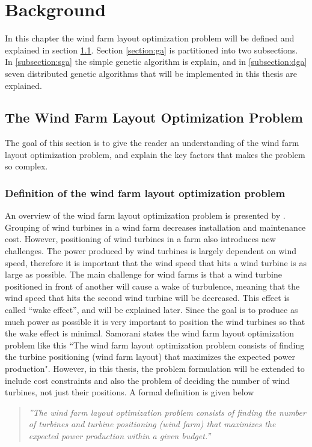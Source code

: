 \chapter{Background}
In this chapter the wind farm layout optimization problem will be defined and explained in section \ref{section:wflop}. Section \ref{section:ga} is partitioned into two subsections. In \ref{subsection:sga} the simple genetic algorithm is explain, and in \ref{subsection:dga} seven distributed genetic algorithms that will be implemented in this thesis are explained. 


\section{The Wind Farm Layout Optimization Problem}\label{section:wflop}
The goal of this section is to give the reader an understanding of the wind farm layout optimization problem, and explain the key factors that makes the problem so complex.


\subsection{Definition of the wind farm layout optimization problem}
An overview of the wind farm layout optimization problem is presented by \cite{Samorani}. Grouping of wind turbines in a wind farm decreases installation and maintenance cost. However, positioning of wind turbines in a farm also introduces new challenges. The power produced by wind turbines is largely dependent on wind speed, therefore it is important that the wind speed that hits a wind turbine is as large as possible. The main challenge for wind farms is that a wind turbine positioned in front of another will cause a wake of turbulence, meaning that the wind speed that hits the second wind turbine will be decreased. This effect is called ``wake effect'', and will be explained later. Since the goal is to produce as much power as possible it is very important to position the wind turbines so that the wake effect is minimal. Samorani states the wind farm layout optimization problem like this ``The wind farm layout optimization problem consists of finding the turbine positioning (wind farm layout) that maximizes the expected power production". However, in this thesis, the problem formulation will be extended to include cost constraints and also the problem of deciding the number of wind turbines, not just their positions. A formal definition is given below


\begin{quote}
\textit{''The wind farm layout optimization problem consists of finding the number of turbines and turbine positioning (wind farm) that maximizes the expected power production within a given budget.''}
\end{quote}


